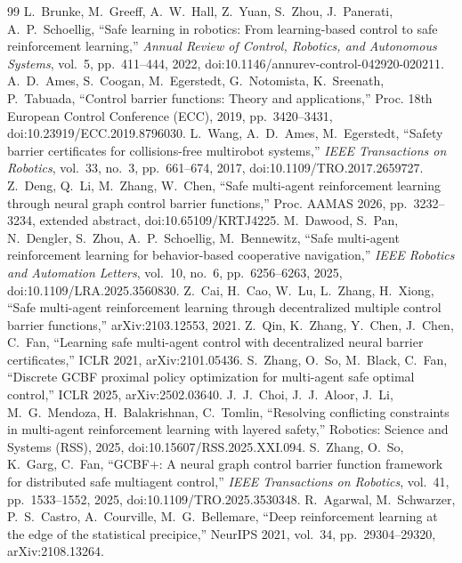 \documentclass[journal]{IEEEtran}
\begin{document}
\begin{thebibliography}{99}
 L.~Brunke, M.~Greeff, A.~W.~Hall, Z.~Yuan, S.~Zhou, J.~Panerati, A.~P.~Schoellig, ``Safe learning in robotics: From learning-based control to safe reinforcement learning,'' \emph{Annual Review of Control, Robotics, and Autonomous Systems}, vol.~5, pp.~411--444, 2022, doi:10.1146/annurev-control-042920-020211.
 A.~D.~Ames, S.~Coogan, M.~Egerstedt, G.~Notomista, K.~Sreenath, P.~Tabuada, ``Control barrier functions: Theory and applications,'' Proc. 18th European Control Conference (ECC), 2019, pp.~3420--3431, doi:10.23919/ECC.2019.8796030.
 L.~Wang, A.~D.~Ames, M.~Egerstedt, ``Safety barrier certificates for collisions-free multirobot systems,'' \emph{IEEE Transactions on Robotics}, vol.~33, no.~3, pp.~661--674, 2017, doi:10.1109/TRO.2017.2659727.
 Z.~Deng, Q.~Li, M.~Zhang, W.~Chen, ``Safe multi-agent reinforcement learning through neural graph control barrier functions,'' Proc. AAMAS 2026, pp.~3232--3234, extended abstract, doi:10.65109/KRTJ4225.
 M.~Dawood, S.~Pan, N.~Dengler, S.~Zhou, A.~P.~Schoellig, M.~Bennewitz, ``Safe multi-agent reinforcement learning for behavior-based cooperative navigation,'' \emph{IEEE Robotics and Automation Letters}, vol.~10, no.~6, pp.~6256--6263, 2025, doi:10.1109/LRA.2025.3560830.
 Z.~Cai, H.~Cao, W.~Lu, L.~Zhang, H.~Xiong, ``Safe multi-agent reinforcement learning through decentralized multiple control barrier functions,'' arXiv:2103.12553, 2021.
 Z.~Qin, K.~Zhang, Y.~Chen, J.~Chen, C.~Fan, ``Learning safe multi-agent control with decentralized neural barrier certificates,'' ICLR 2021, arXiv:2101.05436.
 S.~Zhang, O.~So, M.~Black, C.~Fan, ``Discrete GCBF proximal policy optimization for multi-agent safe optimal control,'' ICLR 2025, arXiv:2502.03640.
 J.~J.~Choi, J.~J.~Aloor, J.~Li, M.~G.~Mendoza, H.~Balakrishnan, C.~Tomlin, ``Resolving conflicting constraints in multi-agent reinforcement learning with layered safety,'' Robotics: Science and Systems (RSS), 2025, doi:10.15607/RSS.2025.XXI.094.
 S.~Zhang, O.~So, K.~Garg, C.~Fan, ``GCBF+: A neural graph control barrier function framework for distributed safe multiagent control,'' \emph{IEEE Transactions on Robotics}, vol.~41, pp.~1533--1552, 2025, doi:10.1109/TRO.2025.3530348.
 R.~Agarwal, M.~Schwarzer, P.~S.~Castro, A.~Courville, M.~G.~Bellemare, ``Deep reinforcement learning at the edge of the statistical precipice,'' NeurIPS 2021, vol.~34, pp.~29304--29320, arXiv:2108.13264.

\end{thebibliography}
\end{document}
